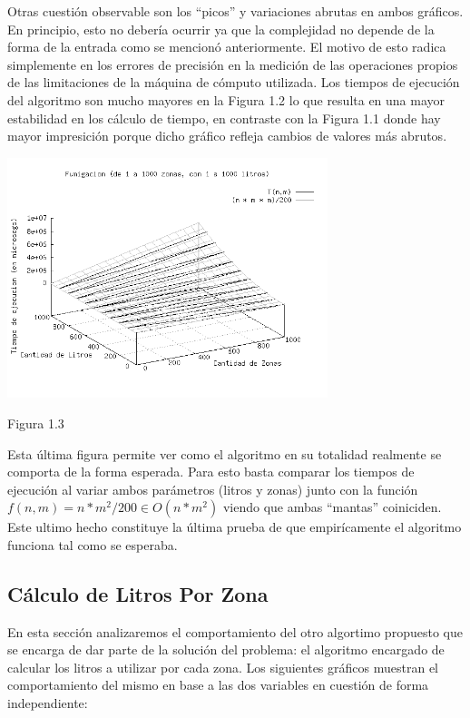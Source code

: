 \documentclass[a4paper,11pt] {article}
\begin{document}
Otras cuesti\'on observable son los ``picos'' y variaciones abrutas en ambos gr\'aficos. En principio, esto no deber\'ia ocurrir ya que la complejidad no depende de la forma de la entrada como se mencion\'o anteriormente. El motivo de esto radica simplemente en los errores de precisi\'on en la medici\'on de las operaciones propios de las limitaciones de la m\'aquina de c\'omputo utilizada. Los tiempos de ejecuci\'on del algoritmo son mucho mayores en la Figura 1.2 lo que resulta en una mayor estabilidad en los c\'alculo de tiempo, en contraste con la Figura 1.1 donde hay mayor impresici\'on porque dicho gr\'afico refleja cambios de valores m\'as abrutos.

\begin{center}
 \includegraphics[width=0.7\textwidth]{Plots/Tp2Ej1-TiemposFumigacion-3d-bw.png}
\begin{center}
Figura 1.3
\end{center}
\end{center}

Esta \'ultima figura permite ver como el algoritmo en su totalidad realmente se comporta de la forma esperada. 
Para esto basta comparar los tiempos de ejecuci\'on al variar ambos par\'ametros (litros y zonas) junto con la funci\'on $f(n,m) = n*m^2/200 \in O(n*m^2)$ viendo que ambas ``mantas'' coiniciden. Este ultimo hecho constituye la \'ultima prueba de que empir\'icamente el algoritmo funciona tal como se esperaba.

\subsection*{C\'alculo de Litros Por Zona}

En esta secci\'on analizaremos el comportamiento del otro algortimo propuesto que se encarga de dar parte de la soluci\'on del problema: el algoritmo encargado de calcular los litros a utilizar por cada zona. Los siguientes gr\'aficos muestran el comportamiento del mismo en base a las dos variables en cuesti\'on de forma independiente:
\end{document}
